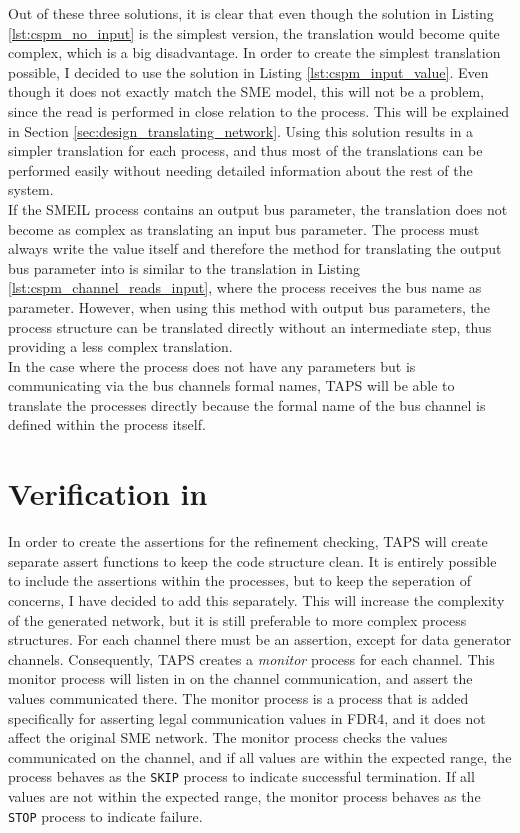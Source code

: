 Out of these three solutions, it is clear that even though the solution in Listing \ref{lst:cspm_no_input} is the simplest version, the translation would become quite complex, which is a big disadvantage. In order to create the simplest translation possible, I decided to use the solution in Listing \ref{lst:cspm_input_value}. Even though it does not exactly match the SME model, this will not be a problem, since the read is performed in close relation to the process. This will be explained in Section \ref{sec:design_translating_network}. Using this solution results in a simpler translation for each process, and thus most of the translations can be performed easily without needing detailed information about the rest of the system.\\

If the SMEIL process contains an output bus parameter, the translation does not become as complex as translating an input bus parameter. The process must always write the value itself and therefore the method for translating the output bus parameter into \cspm{} is similar to the translation in Listing \ref{lst:cspm_channel_reads_input}, where the process receives the bus name as parameter. However, when using this method with output bus parameters, the process structure can be translated directly without an intermediate step, thus providing a less complex translation.\\

In the case where the process does not have any parameters but is communicating via the bus channels formal names, TAPS will be able to translate the processes directly because the formal name of the bus channel is defined within the process itself.

\section{Verification in \cspm{}}
In order to create the assertions for the refinement checking, TAPS will create separate assert functions to keep the code structure clean. It is entirely possible to include the assertions within the processes, but to keep the seperation of concerns, I have decided to add this separately. This will increase the complexity of the generated \cspm{} network, but it is still preferable to more complex process structures. For each \cspm{} channel there must be an assertion, except for data generator channels. Consequently, TAPS creates a \textit{monitor} process for each channel. This monitor process will listen in on the channel communication, and assert the values communicated there. The monitor process is a process that is added specifically for asserting legal communication values in FDR4, and it does not affect the original SME network. The monitor process checks the values communicated on the channel, and if all values are within the expected range, the process behaves as the \texttt{SKIP} process to indicate successful termination. If all values are not within the expected range, the monitor process behaves as the \texttt{STOP} process to indicate failure. \\

